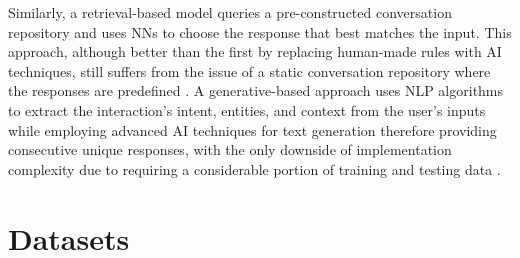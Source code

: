 \documentclass[runningheads]{llncs}
\begin{document}
Similarly, a retrieval-based model queries a pre-constructed conversation repository and uses NNs to choose the response that best matches the input. This approach, although better than the first by replacing human-made rules with AI techniques, still suffers from the issue of a static conversation repository where the responses are predefined \cite{ramesh_survey_2017}. A generative-based approach uses NLP algorithms to extract the interaction's intent, entities, and context from the user's inputs while employing advanced AI techniques for text generation therefore providing consecutive unique responses, with the only downside of implementation complexity due to requiring a considerable portion of training and testing data \cite{ramesh_survey_2017}.

\section{Datasets}
\label{sec:datasets}
\end{document}
